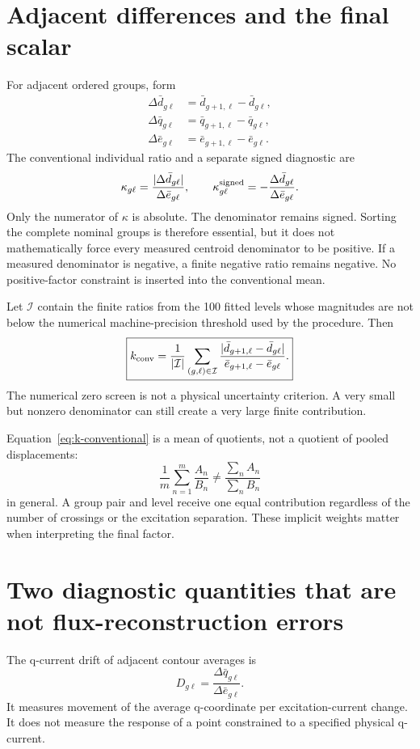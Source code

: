 \section{Adjacent differences and the final scalar}
For adjacent ordered groups, form
\begin{align}
\Delta\bar d_{g\ell}&=\bar d_{g+1,\ell}-\bar d_{g\ell},\\
\Delta\bar q_{g\ell}&=\bar q_{g+1,\ell}-\bar q_{g\ell},\\
\Delta\bar e_{g\ell}&=\bar e_{g+1,\ell}-\bar e_{g\ell}.
\end{align}
The conventional individual ratio and a separate signed diagnostic are
\begin{equation}\label{eq:individual-ratio}
\kappa_{g\ell}=\frac{|\Delta\bar d_{g\ell}|}{\Delta\bar e_{g\ell}},
\qquad
\kappa^{\rm signed}_{g\ell}=-\frac{\Delta\bar d_{g\ell}}{\Delta\bar e_{g\ell}}.
\end{equation}
Only the numerator of $\kappa$ is absolute. The denominator remains signed. Sorting the complete nominal groups is therefore essential, but it does not mathematically force every measured centroid denominator to be positive. If a measured denominator is negative, a finite negative ratio remains negative. No positive-factor constraint is inserted into the conventional mean.

Let $\mathcal I$ contain the finite ratios from the 100 fitted levels whose magnitudes are not below the numerical machine-precision threshold used by the procedure. Then
\begin{equation}\label{eq:k-conventional}
\boxed{
k_{\rm conv}=\frac{1}{|\mathcal I|}
\sum_{(g,\ell)\in\mathcal I}
\frac{|\bar d_{g+1,\ell}-\bar d_{g\ell}|}
{\bar e_{g+1,\ell}-\bar e_{g\ell}}.}
\end{equation}
The numerical zero screen is not a physical uncertainty criterion. A very small but nonzero denominator can still create a very large finite contribution.

Equation~\eqref{eq:k-conventional} is a mean of quotients, not a quotient of pooled displacements:
\begin{equation}
\frac1m\sum_{n=1}^{m}\frac{A_n}{B_n}
\ne\frac{\sum_n A_n}{\sum_n B_n}
\end{equation}
in general. A group pair and level receive one equal contribution regardless of the number of crossings or the excitation separation. These implicit weights matter when interpreting the final factor.

\section{Two diagnostic quantities that are not flux-reconstruction errors}
The q-current drift of adjacent contour averages is
\begin{equation}\label{eq:q-drift}
D_{g\ell}=\frac{\Delta\bar q_{g\ell}}{\Delta\bar e_{g\ell}}.
\end{equation}
It measures movement of the average q-coordinate per excitation-current change. It does not measure the response of a point constrained to a specified physical q-current.


